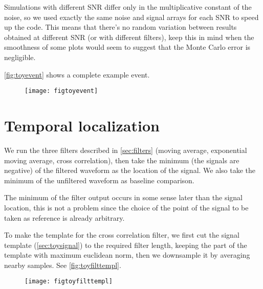 Simulations with different SNR differ only in the multiplicative constant of
the noise, so we used exactly the same noise and signal arrays for each SNR to
speed up the code. This means that there's no random variation between results
obtained at different SNR (or with different filters), keep this in mind when
the smoothness of some plots would seem to suggest that the Monte Carlo error
is negligible.

\autoref{fig:toyevent} shows a complete example event.

\begin{figure}
    \hspace{-0.15\textwidth}
    \texttt{[image: figtoyevent]}
    

\end{figure}

\section{Temporal localization}

We run the three filters described in \autoref{sec:filters} (moving
average, exponential moving average, cross correlation), then take the minimum
(the signals are negative) of the filtered waveform as the location of the
signal. We also take the minimum of the unfiltered waveform as baseline
comparison.

The minimum of the filter output occurs in some sense later than the signal
location, this is not a problem since the choice of the point of the signal to
be taken as reference is already arbitrary.

To make the template for the cross correlation filter, we first cut the signal
template (\autoref{sec:toysignal}) to the required filter length, keeping
the part of the template with maximum euclidean norm, then we downsample it by
averaging nearby samples. See \autoref{fig:toyfilttempl}.

\begin{figure}
    \hspace{0.00\textwidth}
    \texttt{[image: figtoyfilttempl]}
    

\end{figure}


